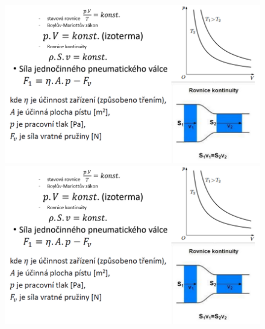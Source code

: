 \begin{figure}[h]
  \begin{center}
    \includegraphics[scale = 0.7]{img/Picture12.png}
  \end{center}
    \begin{center}
        \includegraphics[scale = 0.7]{img/Picture12.png}
    \end{center}
\end{figure}

